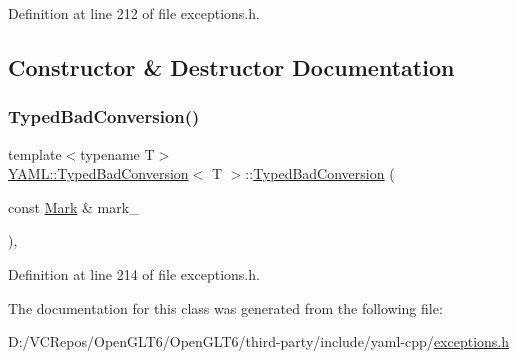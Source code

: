 Definition at line 212 of file exceptions.\+h.



\subsection{Constructor \& Destructor Documentation}
\mbox{\label{class_y_a_m_l_1_1_typed_bad_conversion_a638e002c83e6df499b700367dae3d776}} 
\subsubsection{\texorpdfstring{TypedBadConversion()}{TypedBadConversion()}}
{\footnotesize\ttfamily template$<$typename T$>$ \\
\mbox{\hyperlink{class_y_a_m_l_1_1_typed_bad_conversion}{Y\+A\+M\+L\+::\+Typed\+Bad\+Conversion}}$<$ T $>$\+::\mbox{\hyperlink{class_y_a_m_l_1_1_typed_bad_conversion}{Typed\+Bad\+Conversion}} (\begin{DoxyParamCaption}\item[{const \mbox{\hyperlink{struct_y_a_m_l_1_1_mark}{Mark}} \&}]{mark\+\_\+ }\end{DoxyParamCaption})\hspace{0.3cm}{\ttfamily [inline]}, {\ttfamily [explicit]}}



Definition at line 214 of file exceptions.\+h.



The documentation for this class was generated from the following file\+:\begin{DoxyCompactItemize}
\item 
D\+:/\+V\+C\+Repos/\+Open\+G\+L\+T6/\+Open\+G\+L\+T6/third-\/party/include/yaml-\/cpp/\mbox{\hyperlink{exceptions_8h}{exceptions.\+h}}\end{DoxyCompactItemize}
